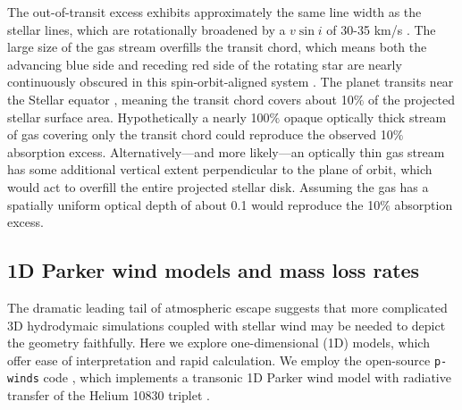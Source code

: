 \documentclass[twocolumn]{aastex631}
\begin{document}
The out-of-transit excess exhibits approximately the same line width as the stellar lines, which are rotationally broadened by a $v\sin{i}$ of 30-35 km/s \citep{2017AJ....153..211Z}.  The large size of the gas stream overfills the transit chord, which means both the advancing blue side and receding red side of the rotating star are nearly continuously obscured in this spin-orbit-aligned system \citep{2017AJ....153..211Z}. The planet transits near the Stellar equator \citep{2017AJ....153..211Z}, meaning the transit chord covers about 10$\%$ of the projected stellar surface area.  Hypothetically a nearly 100$\%$ opaque optically thick stream of gas covering only the transit chord could reproduce the observed 10$\%$ absorption excess.  Alternatively---and more likely---an optically thin gas stream has some additional vertical extent perpendicular to the plane of orbit, which would act to overfill the entire projected stellar disk.  Assuming the gas has a spatially uniform optical depth of about 0.1 would reproduce the 10\% absorption excess.


\subsection{1D Parker wind models and mass loss rates}\label{pwinds}
The dramatic leading tail of atmospheric escape suggests that more complicated 3D hydrodymaic simulations coupled with stellar wind \citep{2022ApJ...926..226M} may be needed to depict the geometry faithfully.  Here we explore one-dimensional (1D) models, which offer ease of interpretation and rapid calculation.  We employ the open-source \texttt{p-winds} code \citep{2022A&A...659A..62D}, which implements a transonic 1D Parker wind model with radiative transfer of the Helium 10830 triplet \citep{2018ApJ...855L..11O,2020A&A...636A..13L}.
\end{document}
